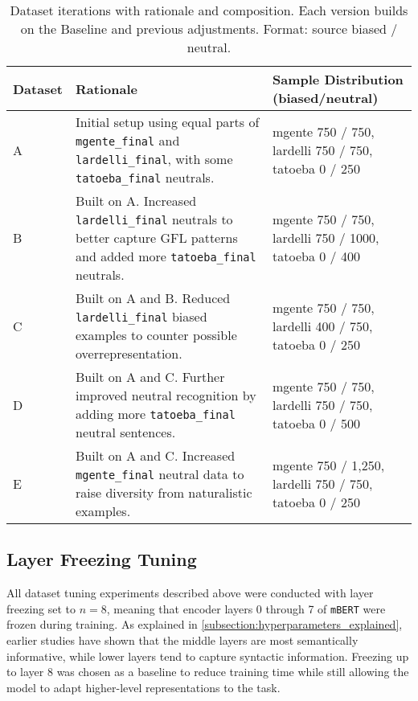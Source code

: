\vspace{0.8em}
\begin{table}[ht]
    \centering
        \begin{tabularx}{\textwidth}{l X >{\raggedright\arraybackslash}X}
    \toprule
    \textbf{Dataset} & \textbf{Rationale} & \textbf{Sample Distribution (biased/neutral)} \\
    \midrule
    A & Initial setup using equal parts of \texttt{mgente\_final} and \texttt{lardelli\_final}, with some \texttt{tatoeba\_final} neutrals. & mgente 750 / 750, lardelli 750 / 750, tatoeba 0 / 250 \\
    B & Built on A. Increased \texttt{lardelli\_final} neutrals to better capture GFL patterns and added more \texttt{tatoeba\_final} neutrals. & mgente 750 / 750, lardelli 750 / 1000, tatoeba 0 / 400 \\
    C & Built on A and B. Reduced \texttt{lardelli\_final} biased examples to counter possible overrepresentation. & mgente 750 / 750, lardelli 400 / 750, tatoeba 0 / 250 \\
    D & Built on A and C. Further improved neutral recognition by adding more \texttt{tatoeba\_final} neutral sentences. & mgente 750 / 750, lardelli 750 / 750, tatoeba 0 / 500 \\
    E & Built on A and C. Increased \texttt{mgente\_final} neutral data to raise diversity from naturalistic examples. & mgente 750 / 1,250, lardelli 750 / 750, tatoeba 0 / 250 \\
    \bottomrule
    \end{tabularx}
    \caption{Dataset iterations with rationale and composition. Each version builds on the Baseline and previous adjustments. Format: source biased / neutral.}
    \label{tab:dataset_versions}
\end{table}


\subsection{Layer Freezing Tuning}
    All dataset tuning experiments described above were conducted with layer freezing set to $n=8$, meaning that encoder layers 0 through 7 of \texttt{mBERT} were frozen during training. As explained in \autoref{subsection:hyperparameters_explained}, earlier studies have shown that the middle layers are most semantically informative, while lower layers tend to capture syntactic information. Freezing up to layer 8 was chosen as a baseline to reduce training time while still allowing the model to adapt higher-level representations to the task.

